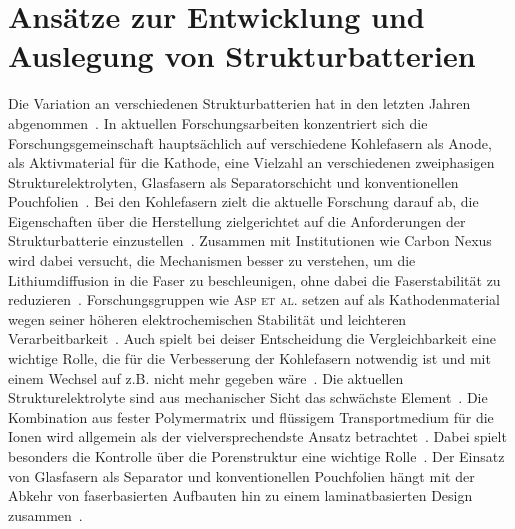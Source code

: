 \section{Ansätze zur Entwicklung und Auslegung von Strukturbatterien}
Die Variation an verschiedenen Strukturbatterien hat in den letzten Jahren abgenommen~\cite{Asp2024}. In aktuellen Forschungsarbeiten konzentriert sich die Forschungsgemeinschaft hauptsächlich auf verschiedene Kohlefasern als Anode,  als Aktivmaterial für die Kathode, eine Vielzahl an verschiedenen zweiphasigen Strukturelektrolyten, Glasfasern als Separatorschicht und konventionellen Pouchfolien~\cite{Asp2021,Jin2023, Asp2024,Chaudhary2024}. Bei den Kohlefasern zielt die aktuelle Forschung darauf ab, die Eigenschaften über die Herstellung zielgerichtet auf die Anforderungen der Strukturbatterie einzustellen~\cite{Asp2024}. Zusammen mit Institutionen wie Carbon Nexus wird dabei versucht, die Mechanismen besser zu verstehen, um die Lithiumdiffusion in die Faser zu beschleunigen, ohne dabei die Faserstabilität zu reduzieren~\cite{Duan2021,Larsson2023,Johansen2024,Asp2024}. Forschungsgruppen wie \textsc{Asp et al.} setzen auf  als Kathodenmaterial wegen seiner höheren elektrochemischen Stabilität und leichteren Verarbeitbarkeit~\cite{Asp2021, Siraj2023, Ye2024, Chaudhary2024}. Auch spielt bei deiser Entscheidung die Vergleichbarkeit eine wichtige Rolle, die für die Verbesserung der Kohlefasern notwendig ist und mit einem Wechsel auf z.B.  nicht mehr gegeben wäre~\cite{Asp2024}. Die aktuellen Strukturelektrolyte sind aus mechanischer Sicht das schwächste Element~\cite{Lee2019,Jin2023}. Die Kombination aus fester Polymermatrix und flüssigem Transportmedium für die Ionen wird allgemein als der vielversprechendste Ansatz betrachtet~\cite{Lee2019,Asp2021, Greenhalgh2023}. Dabei spielt besonders die Kontrolle über die Porenstruktur eine wichtige Rolle~\cite{Lee2019}. Der Einsatz von Glasfasern als Separator und konventionellen Pouchfolien hängt mit der Abkehr von faserbasierten Aufbauten hin zu einem laminatbasierten Design zusammen~\cite{Zhao2020,Xu2022}.

